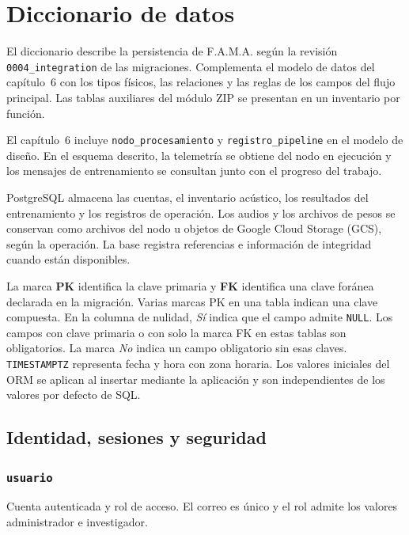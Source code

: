 \chapter{Diccionario de datos}
\label{ap:diccionario-datos}

El diccionario describe la persistencia de F.A.M.A. según la revisión
\texttt{0004\_integration} de las migraciones. Complementa el modelo
de datos del capítulo~6 con los tipos físicos, las relaciones y las
reglas de los campos del flujo principal. Las tablas auxiliares del
módulo ZIP se presentan en un inventario por función.

El capítulo~6 incluye \texttt{nodo\_procesamiento} y
\texttt{registro\_pipeline} en el modelo de diseño. En el esquema
descrito, la telemetría se obtiene del nodo en ejecución y los
mensajes de entrenamiento se consultan junto con el progreso del
trabajo.

PostgreSQL almacena las cuentas, el inventario acústico, los resultados
del entrenamiento y los registros de operación. Los audios y los
archivos de pesos se conservan como archivos del nodo u objetos de
Google Cloud Storage (GCS), según la operación. La base registra
referencias e información de integridad cuando están disponibles.

La marca \textbf{PK} identifica la clave primaria y \textbf{FK}
identifica una clave foránea declarada en la migración. Varias marcas
PK en una tabla indican una clave compuesta. En la columna de nulidad,
\emph{Sí} indica que el campo admite \texttt{NULL}. Los campos con clave
primaria o con solo la marca FK en estas tablas son obligatorios.
La marca \emph{No} indica un campo obligatorio sin esas claves.
\texttt{TIMESTAMPTZ} representa fecha y hora con zona horaria.
Los valores iniciales del ORM se aplican al insertar mediante la
aplicación y son independientes de los valores por defecto de SQL.

\begingroup
\small
\setlength{\tabcolsep}{4pt}
\renewcommand{\arraystretch}{1.12}

\section*{Identidad, sesiones y seguridad}

\subsection*{\texttt{usuario}}

Cuenta autenticada y rol de acceso. El correo es único y el rol admite los valores administrador e investigador.

